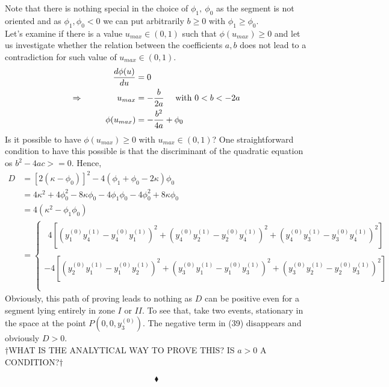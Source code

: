 Note that there is nothing special in the choice of $\phi_1, \ \phi_0$ as the segment is not oriented and as $\phi_1,\phi_0 <0$ we can put arbitrarily $b \geq0$ with $\phi_1 \geq \phi_0$.\\ 
Let's examine if there is a value $u_{max} \in (0,1)$ such that $\phi(u_{max})\geq 0$ and let us investigate whether the relation between the coefficients $a,b$ does not lead to a contradiction for such value of $u_{max} \in (0,1)$.  
\begin{align}
\dv{\phi(u)}{u}&=0\\
\Rightarrow\quad\quad\quad\quad u_{max} &= -\frac{b}{2a}\quad\text{ with } 0<b < -2a\\
\phi(u_{max}) &= -\frac{b^2}{4a}+\phi_0
\end{align}
Is it possible to have $\phi(u_{max}) \geq 0$ with $u_{max} \in (0,1)$? One straightforward condition to have this possible is that the discriminant of the quadratic equation os $b^2-4ac>=0$.
Hence,
\begin{align}
D &= \left[2 \left(\kappa- \phi_0\right)\right]^2-4\left(\phi_1 +\phi_0-2\kappa\right)\phi_0\\
&= 4\kappa^2+ 4\phi_0^2-8\kappa\phi_0-4\phi_1\phi_0 -4\phi_0^2+8\kappa\phi_0\\
&= 4\left(\kappa^2-\phi_1\phi_0\right)\\
&= \left\{\begin{array}{l} \ \ 
4\left[\left(y_1^{(0)}y_4^{(1)}-y_4^{(0)}y_1^{(1)}\right)^2
+\left(y_4^{(0)}y_2^{(1)}-y_2^{(0)}y_4^{(1)}\right)^2
+\left(y_4^{(0)}y_3^{(1)}-y_3^{(0)}y_4^{(1)}\right)^2\right]\\\\
-4\left[\left(y_2^{(0)}y_1^{(1)}-y_1^{(0)}y_2^{(1)}\right)^2
+\left(y_3^{(0)}y_1^{(1)}-y_1^{(0)}y_3^{(1)}\right)^2
+\left(y_3^{(0)}y_2^{(1)}-y_2^{(0)}y_3^{(1)}\right)^2\right]\\\\
\end{array}\right.
\end{align}
Obviously, this path of proving leads to nothing as $D$ can be positive even for a segment lying entirely in zone $I$ or $II$. To see that, take two events, stationary in  the space  at the point $P\left(0,0,y_3^{(0)}\right)$. The negative term in (39) disappears and obviously $D>0$.\\
$\dagger$WHAT IS THE ANALYTICAL WAY TO PROVE THIS? IS $a>0$ A CONDITION?$\dagger$
\begin{comment}
\begin{figure}[H]

\caption{Travelling between two points in region III (present) in a  $V_3$ space-time manifold}
\label{fig:fig_p96_3415_b}
\end{figure}
\end{comment}
$$\blacklozenge$$
\newpage

